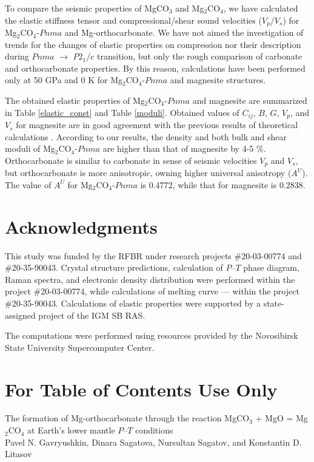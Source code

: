 \documentclass[a4paperm]{article}
\begin{document}
To compare the seismic properties of MgCO$_3$ and Mg$_2$CO$_4$, we have calculated the elastic stiffness tensor and compressional/shear sound velocities ($V_p$/$V_s$) for Mg$_2$CO$_4$-$Pnma$ and Mg-orthocarbonate.
We have not aimed the investigation of trends for the changes of elastic properties on compression nor their description during $Pnma$ $\to$ $P2_1/c$ transition, but only the rough comparison of carbonate and orthocarbonate properties.
By this reason, calculations have been performed only at 50 GPa and 0 K for Mg$_2$CO$_4$-$Pnma$ and magnesite structures.

The obtained elastic properties of Mg$_2$CO$_4$-$Pnma$ and magnesite are summarized in Table \ref{elastic_const} and Table \ref{moduli}.
Obtained values of $C_{ij}$, $B$, $G$, $V_p$, and $V_s$ for magnesite are in good agreement with the previous results of theoretical calculations \cite{li2020_mgco3}.
According to our results, the density and both bulk and shear moduli of Mg$_2$CO$_4$-$Pnma$ are higher than that of magnesite by 4-5 \%.
Orthocarbonate is similar to carbonate in sense of seismic velocities $V_p$ and $V_s$, but orthocarbonate is more anisotropic, owning higher universal anisotropy ($A^U$).
The value of $A^U$ for Mg$_2$CO$_4$-$Pnma$ is 0.4772, while that for magnesite is 0.2838.


\section*{Acknowledgments}
This study was funded by the RFBR under research projects \#20-03-00774 and \#20-35-90043.
Crystal structure predictions, calculation of $P$--$T$ phase diagram, Raman spectra, and electronic density distribution were performed within the project \#20-03-00774, while calculations of melting curve --- within the project \#20-35-90043.
Calculations of elastic properties were supported by a state-assigned project of the IGM SB RAS. 

The computations were performed using resources provided by the Novosibirsk State University Supercomputer Center.




\newpage
\section*{For Table of Contents Use Only}

The formation of Mg-orthocarbonate through the reaction MgCO$_3$ + MgO = Mg$_2$CO$_4$ at Earth's lower mantle $P$--$T$ conditions
\vspace{5mm} \\
Pavel N. Gavryushkin, Dinara Sagatova, Nursultan Sagatov, and Konstantin D. Litasov
\vspace{5mm} \\
\end{document}
